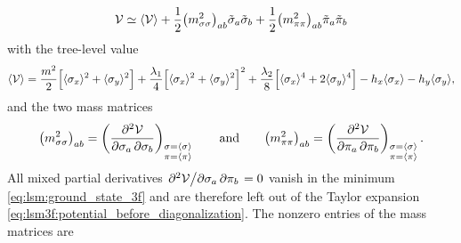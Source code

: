 \begin{equation}
	\mathcal{V} \simeq \langle \mathcal{V} \rangle + \frac12 \big(m^2_{\sigma\sigma}\big)_{ab} \tilde{\sigma}_a \tilde{\sigma}_b + \frac12 \big(m^2_{\pi\pi}\big)_{ab} \tilde{\pi}_a \tilde{\pi}_b
\label{eq:lsm3f:potential_before_diagonalization}
\end{equation}
with the tree-level value
\begin{equation}
	\langle \mathcal{V} \rangle = \frac{m^2}{2} \Big[ \langle \sigma_x \rangle^2 + \langle \sigma_y \rangle^2 \Big] + \frac{\lambda_1}{4} \Big[ \langle \sigma_x \rangle^2 + \langle \sigma_y \rangle^2 \Big]^2 + \frac{\lambda_2}{8} \Big[ \langle \sigma_x \rangle^4 + 2 \langle \sigma_y \rangle^4 \Big] - h_x \langle \sigma_x \rangle - h_y \langle \sigma_y \rangle,
\label{eq:lsm:potential_tree_3f}
\end{equation}
and the two mass matrices
\begin{equation}
	\big(m^2_{\sigma\sigma}\big)_{ab} = \pdv{\mathcal{V}}{\sigma_a, \sigma_b}_{\substack{\sigma=\langle \sigma \rangle\\\pi=\langle \pi \rangle}}
	\qquad \text{and} \qquad
	\big(m^2_{\pi\pi}\big)_{ab}       = \pdv{\mathcal{V}}{\pi_a, \pi_b}_{\substack{\sigma=\langle \sigma \rangle\\\pi=\langle \pi \rangle}}.
\end{equation}
All mixed partial derivatives $\pdv{\mathcal{V}}/{\sigma_a,\pi_b} = 0$ vanish in the minimum \eqref{eq:lsm:ground_state_3f} and are therefore left out of the Taylor expansion \eqref{eq:lsm3f:potential_before_diagonalization}.
The nonzero entries of the mass matrices are
